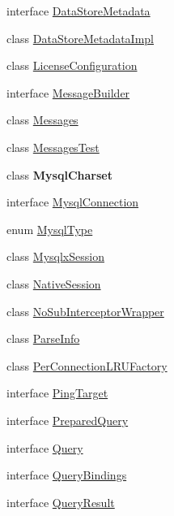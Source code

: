 \begin{DoxyCompactItemize}
\item 
interface \mbox{\hyperlink{interfacecom_1_1mysql_1_1cj_1_1_data_store_metadata}{Data\+Store\+Metadata}}
\item 
class \mbox{\hyperlink{classcom_1_1mysql_1_1cj_1_1_data_store_metadata_impl}{Data\+Store\+Metadata\+Impl}}
\item 
class \mbox{\hyperlink{classcom_1_1mysql_1_1cj_1_1_license_configuration}{License\+Configuration}}
\item 
interface \mbox{\hyperlink{interfacecom_1_1mysql_1_1cj_1_1_message_builder}{Message\+Builder}}
\item 
class \mbox{\hyperlink{classcom_1_1mysql_1_1cj_1_1_messages}{Messages}}
\item 
class \mbox{\hyperlink{classcom_1_1mysql_1_1cj_1_1_messages_test}{Messages\+Test}}
\item 
class {\bfseries Mysql\+Charset}
\item 
interface \mbox{\hyperlink{interfacecom_1_1mysql_1_1cj_1_1_mysql_connection}{Mysql\+Connection}}
\item 
enum \mbox{\hyperlink{enumcom_1_1mysql_1_1cj_1_1_mysql_type}{Mysql\+Type}}
\item 
class \mbox{\hyperlink{classcom_1_1mysql_1_1cj_1_1_mysqlx_session}{Mysqlx\+Session}}
\item 
class \mbox{\hyperlink{classcom_1_1mysql_1_1cj_1_1_native_session}{Native\+Session}}
\item 
class \mbox{\hyperlink{classcom_1_1mysql_1_1cj_1_1_no_sub_interceptor_wrapper}{No\+Sub\+Interceptor\+Wrapper}}
\item 
class \mbox{\hyperlink{classcom_1_1mysql_1_1cj_1_1_parse_info}{Parse\+Info}}
\item 
class \mbox{\hyperlink{classcom_1_1mysql_1_1cj_1_1_per_connection_l_r_u_factory}{Per\+Connection\+L\+R\+U\+Factory}}
\item 
interface \mbox{\hyperlink{interfacecom_1_1mysql_1_1cj_1_1_ping_target}{Ping\+Target}}
\item 
interface \mbox{\hyperlink{interfacecom_1_1mysql_1_1cj_1_1_prepared_query}{Prepared\+Query}}
\item 
interface \mbox{\hyperlink{interfacecom_1_1mysql_1_1cj_1_1_query}{Query}}
\item 
interface \mbox{\hyperlink{interfacecom_1_1mysql_1_1cj_1_1_query_bindings}{Query\+Bindings}}
\item 
interface \mbox{\hyperlink{interfacecom_1_1mysql_1_1cj_1_1_query_result}{Query\+Result}}
\item 

\end{DoxyCompactItemize}
